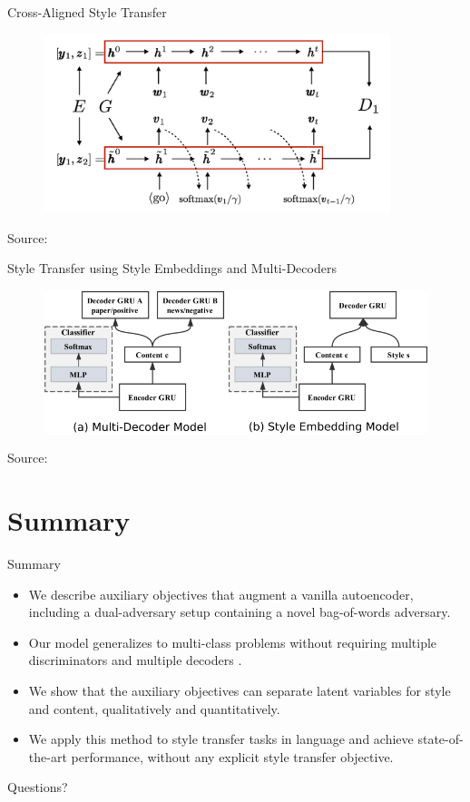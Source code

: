 \documentclass[aspectratio=169]{beamer}
\newcommand{\imgsrc}[1]{\tiny{Source: #1}}
\begin{document}
\begin{frame}{Cross-Aligned Style Transfer}
	\centering
	\begin{figure}[ht]
		\includegraphics[width=0.9\textwidth]{images/stca-cross-align}
	\end{figure}
	\imgsrc{\citet{shen2017style}}
\end{frame}

\begin{frame}{Style Transfer using Style Embeddings and Multi-Decoders}
	\centering
	\begin{figure}[ht]
		\includegraphics[width=\textwidth]{images/semb-architecture}
	\end{figure}
	\imgsrc{\citet{fu2017style}}
\end{frame}

% 

\section{Summary}

\begin{frame}{Summary}
	\begin{itemize}
		\item We describe auxiliary objectives that augment a vanilla autoencoder, including a dual-adversary setup containing a novel bag-of-words adversary.
		\item Our model generalizes to multi-class problems without requiring multiple discriminators \citep{hu2017toward,shen2017style} and multiple decoders \citep{fu2017style}.
		\item We show that the auxiliary objectives can separate latent variables for style and content, qualitatively and quantitatively.
		\item We apply this method to style transfer tasks in language and achieve state-of-the-art performance, without any explicit style transfer objective.
	\end{itemize}
\end{frame}

\begin{frame}[allowframebreaks]
	
	
\end{frame}

\begin{frame}
	\centering
	\Huge{Questions?}
\end{frame}
\end{document}
